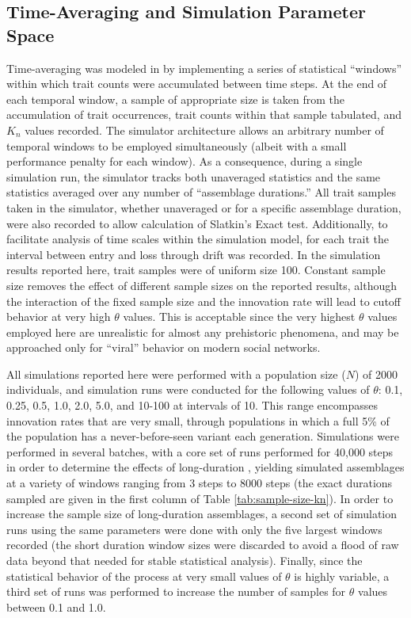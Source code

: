 \subsection{Time-Averaging and Simulation Parameter Space}
\label{ta:sec:parameter-space}
Time-averaging was modeled in \tf by implementing a series of statistical ``windows'' within which trait counts were accumulated between time steps.  At the end of each temporal window, a sample of appropriate size is taken from the accumulation of trait occurrences, trait counts within that sample tabulated, and $K_n$ values recorded.  The simulator architecture allows an arbitrary number of temporal windows to be employed simultaneously (albeit with a small performance penalty for each window).  As a consequence, during a single simulation run, the simulator tracks both unaveraged statistics and the same statistics averaged over any number of ``assemblage durations.''  All trait samples taken in the simulator, whether unaveraged or for a specific assemblage duration, were also recorded to allow calculation of Slatkin's Exact test. Additionally, to facilitate analysis of time scales within the simulation model, for each trait the interval between entry and loss through drift was recorded.   In the simulation results reported here, trait samples were of uniform size 100.  Constant sample size removes the effect of different sample sizes on the reported results, although the interaction of the fixed sample size and the innovation rate will lead to cutoff behavior at very high $\theta$ values.  This is acceptable since the very highest $\theta$ values employed here are unrealistic for almost any prehistoric phenomena, and may be approached only for ``viral'' behavior on modern social networks.    

All simulations reported here were performed with a population size ($N$) of 2000 individuals, and simulation runs were conducted for the following values of $\theta$:  0.1, 0.25, 0.5, 1.0, 2.0, 5.0, and 10-100 at intervals of 10.  This range encompasses innovation rates that are very small, through populations in which a full 5\% of the population has a never\hyp{}before\hyp{}seen variant each generation.  Simulations were performed in several batches, with a core set of runs performed for 40,000 steps in order to determine the effects of long-duration \timeav, yielding simulated assemblages at a variety of windows ranging from 3 steps to 8000 steps (the exact durations sampled are given in the first column of Table \ref{tab:sample-size-kn}).  In order to increase the sample size of long-duration assemblages, a second set of simulation runs using the same parameters were done with only the five largest windows recorded (the short duration window sizes were discarded to avoid a flood of raw data beyond that needed for stable statistical analysis).  Finally, since the statistical behavior of the process at very small values of $\theta$ is highly variable, a third set of runs was performed to increase the number of samples for $\theta$ values between 0.1 and 1.0.  

